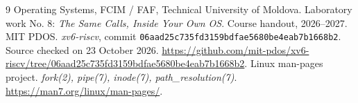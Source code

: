 \begin{thebibliography}{9}
 Operating Systems, FCIM / FAF, Technical University of Moldova.
Laboratory work No. 8: \emph{The Same Calls, Inside Your Own OS}. Course handout, 2026--2027.
 MIT PDOS. \emph{xv6-riscv}, commit
\texttt{06aad25c735fd3159bdfae5680be4eab7b1668b2}.
Source checked on 23 October 2026.
\url{https://github.com/mit-pdos/xv6-riscv/tree/06aad25c735fd3159bdfae5680be4eab7b1668b2}.
 Linux man-pages project. \emph{fork(2), pipe(7), inode(7), path\_resolution(7)}.
\url{https://man7.org/linux/man-pages/}.
\end{thebibliography}
